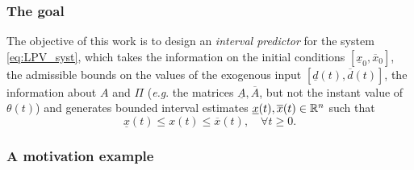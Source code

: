 \subsubsection{The goal}

The objective of this work is to design an \emph{interval predictor} for the system \eqref{eq:LPV_syst}, which takes the information on the initial conditions $[\underline{x}_{0},\overline{x}_{0}]$, the admissible bounds on the values of the exogenous input $[\underline{d}(t),\overline{d}(t)]$, the information about $A$ and $\Pi$ (\emph{e.g}. the matrices $\underline{A},\overline{A}$, but not the instant value of $\theta(t)$) and generates bounded interval estimates $\underline{x}(t),\overline{x}(t)\in\mathbb{R}^{n}$ such that
\begin{equation}
\underline{x}(t)\leq x(t)\leq\overline{x}(t),\quad\forall t\geq0.\label{eq:Interval_Goal}
\end{equation}

\subsubsection{A motivation example}

